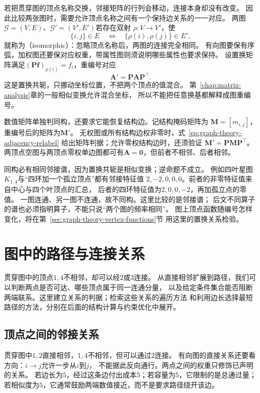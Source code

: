 若把贯穿图的顶点名称交换，邻接矩阵的行列会移动，连接本身却没有改变。
因此比较两张图时，需要允许顶点名称之间有一个保持边关系的一一对应。
两图\(\mathcal G=(V,E)\)、\(\mathcal G'=(V',E')\)若存在双射
\(\rho:V\to V'\)，使
\[
  \{i,j\}\in E
  \quad\Longleftrightarrow\quad
  \{\rho(i),\rho(j)\}\in E',
\]
就称为（isomorphic）：忽略顶点名称后，两图的连接完全相同。
有向图要保有序弧，加权图还要保对应权重，带属性图则须说明哪些属性也要求保持。
设置换矩阵满足\((\bm P\bm f)_{\rho(i)}=f_i\)，重编号对应
\begin{equation}
  \bm A'=\bm P\bm A\bm P^\top.
  \label{eq:graph-theory-adjacency-relabel}
\end{equation}
这是置换共轭，只挪动坐标位置，不把两个顶点的值混合。
第~\ref{chap:matrix-analysis}章的一般相似变换允许混合坐标，
所以不能把任意换基都解释成图重编号。

数值矩阵单独判同构，还要求它能恢复结构边。记结构掩码矩阵为
\(\bm M=[m_{i,j}]\)，重编号后的矩阵为\(\bm M'\)。
无权图或所有结构边权非零时，式~\eqref{eq:graph-theory-adjacency-relabel}
给出矩阵判据；允许零权结构边时，还须验证
\(\bm M'=\bm P\bm M\bm P^\top\)。
两顶点空图与两顶点零权单边图都可有\(\bm A=\bm0\)，但前者不相邻、后者相邻。

同构必有相同邻接谱，因为置换共轭是相似变换；逆命题不成立。
例如四叶星图\(K_{1,4}\)与“四环加一个孤立顶点”都有邻接特征值
\(2,-2,0,0,0\)。前者的非零特征值来自中心与四个叶顶点的汇总，
后者的四环特征值为\(2,0,0,-2\)，再加孤立点的零值。
一图连通、另一图不连通，故不同构。这里比较的是邻接谱；
后文不同算子的谱也必须指明算子，不能只说“两个图的频率相同”。
图上顶点函数随编号怎样变化，将在第~\ref{sec:graph-theory-vertex-functions}节
用这里的置换关系检验。

\section{图中的路径与连接关系}
\label{sec:graph-theory-paths-traversal}

贯穿图中的顶点\(1,4\)不相邻，却可以经\(2\)或\(3\)连接。
从直接相邻扩展到路径，我们可以判断两点是否可达、哪些顶点属于同一连通分量，
以及给定条件集合能否阻断两端联系。这里建立关系的判据；检索这些关系的遍历方法
和利用边长选择最短路径的方法，分别在后面的结构计算与约束优化中展开。

\subsection{顶点之间的邻接关系}

贯穿图中\(1,2\)直接相邻，\(1,4\)不相邻，但可以通过\(2\)连接。
有向图的直接关系还要看方向：\(i\to j\)允许一步从\(i\)到\(j\)，
不能据此反向通行。两点之间的权重只修饰已声明的关系。
若边长为\(5\)，经过这条边付出成本\(5\)；若容量为\(5\)，它限制的是总通过量；
若相似度为\(5\)，它通常鼓励两端数值接近，而不是要求路径绕开该边。

